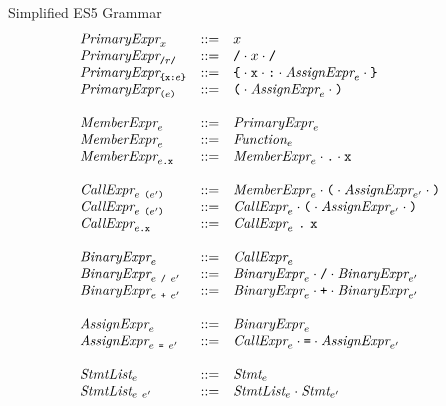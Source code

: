 \documentclass[9pt]{sigplanconf}
\begin{document}
\begin{displayfigure*}{\label{fig:grammar}Simplified ES5 Grammar}
\[
\begin{array}{lcl}
  \textit{PrimaryExpr}_{x} &::=& x
  \\
  \textit{PrimaryExpr}_{\texttt{/}r\texttt{/}} &::=& \texttt{/} \cdot x \cdot \texttt{/}
  \\
  \textit{PrimaryExpr}_{
    \texttt{\{} \texttt{x} \texttt{:} e \texttt{\}}
  } 
  &::=& 
  \texttt{\{} \cdot \texttt{x} \cdot \texttt{:} \cdot  \textit{AssignExpr}_{e}
    \cdot \texttt{\}}
  \\
  \textit{PrimaryExpr}_{\texttt{(} e \texttt{)}} &::=& 
  \texttt{(} \cdot \textit{AssignExpr}_{e} \cdot \texttt{)}
  \\ \\
  \textit{MemberExpr}_{e} &::=&
  \textit{PrimaryExpr}_{e}
  \\
  \textit{MemberExpr}_{e} &::=&
  \textit{Function}_{e}
  \\
  \textit{MemberExpr}_{e\texttt{.\texttt{x}}} &::=&
  \textit{MemberExpr}_{e} \cdot \texttt{.} \cdot \texttt{x}
  \\ \\
  \textit{CallExpr}_{e~ \texttt{(}e' \texttt{)}} &::=& 
  \textit{MemberExpr}_{e} \cdot
  \texttt{(}\cdot \textit{AssignExpr}_{e'} \cdot \texttt{)}
  \\
  \textit{CallExpr}_{e~ \texttt{(}e' \texttt{)}} &::=& 
  \textit{CallExpr}_{e} \cdot
  \texttt{(}\cdot \textit{AssignExpr}_{e'} \cdot \texttt{)}
  \\
  \textit{CallExpr}_{e\texttt{.\texttt{x}}} &::=& 
  \textit{CallExpr}_{e}~\texttt{.}~
  \texttt{x}
  \\ \\
  \textit{BinaryExpr}_{e} &::=& \textit{CallExpr}_{e} \\
  \textit{BinaryExpr}_{e ~\texttt{/}~ e'}
  &::=&
  \textit{BinaryExpr}_{e} \cdot \texttt{/} \cdot  \textit{BinaryExpr}_{e'} \\
  \textit{BinaryExpr}_{e ~\texttt{+}~ e'}
  &::=&
  \textit{BinaryExpr}_{e} \cdot \texttt{+} \cdot \textit{BinaryExpr}_{e'}
  \\ \\
  \textit{AssignExpr}_{e} &::=&
  \textit{BinaryExpr}_{e}
  \\
  \textit{AssignExpr}_{e~\texttt{=}~e'} &::=&
  \textit{CallExpr}_{e} \cdot \texttt{=} \cdot
  \textit{AssignExpr}_{e'}
  \\ \\
  \textit{StmtList}_{e} &::=&
  \textit{Stmt}_{e}
  \\
  \textit{StmtList}_{e~e'} &::=&
  \textit{StmtList}_{e} \cdot
  \textit{Stmt}_{e'}

\end{array}\]
\end{displayfigure*}
\end{document}
